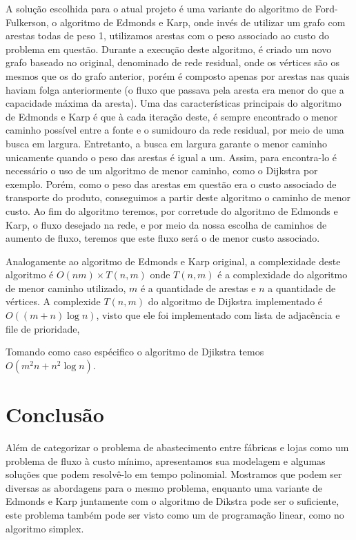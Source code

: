 \documentclass[12pt, a4]{article}
\begin{document}
A solução escolhida para o atual projeto é uma variante do algoritmo de
Ford-Fulkerson, o algoritmo de Edmonds e Karp, onde invés de utilizar um grafo
com arestas todas de peso 1, utilizamos arestas com o peso associado ao custo do
problema em questão. Durante a execução deste algoritmo, é criado um novo grafo
baseado no original, denominado de rede residual, onde os vértices são os mesmos
que os do grafo anterior, porém é composto apenas por arestas nas quais haviam
folga anteriormente (o fluxo que passava pela aresta era menor do que a
capacidade máxima da aresta). Uma das características principais do algoritmo de
Edmonds e Karp é que à cada iteração deste, é sempre encontrado o menor caminho
possível entre a fonte e o sumidouro da rede residual, por meio de uma busca em
largura. Entretanto, a busca em largura garante o menor caminho unicamente
quando o peso das arestas é igual a um. Assim, para encontra-lo é necessário o
uso de um algoritmo de menor caminho, como o Dijkstra por exemplo. Porém, como o
peso das arestas em questão era o custo associado de transporte do produto,
conseguimos a partir deste algoritmo o caminho de menor custo. Ao fim do
algoritmo teremos, por corretude do algoritmo de Edmonds e Karp, o fluxo
desejado na rede, e por meio da nossa escolha de caminhos de aumento de fluxo,
teremos que este fluxo será o de menor custo associado.

Analogamente ao algoritmo de Edmonds e Karp original, a complexidade deste
algoritmo é $O(nm) \times T(n,m)$ onde $T(n,m)$ é a complexidade do algoritmo de
menor caminho utilizado, $m$ é a quantidade de arestas e $n$ a quantidade de
vértices. A complexide $T(n,m)$ do algoritmo de Dijkstra implementado é
$O((m + n) \log n)$, visto que ele foi implementado com lista de adjacência e file de
prioridade,

Tomando como caso espécifico o algoritmo de Djikstra
temos $O(m^2 n + n^2 \log n)$.

\section{Conclusão}
\label{sec:conclusion}

Além de categorizar o problema de abastecimento entre fábricas e lojas como um
problema de fluxo à custo mínimo, apresentamos sua modelagem e algumas soluções
que podem resolvê-lo em tempo polinomial. Mostramos que podem ser diversas as
abordagens para o mesmo problema, enquanto uma variante de Edmonds e Karp
juntamente com o algoritmo de Dikstra pode ser o suficiente, este problema
também pode ser visto como um de programação linear, como no algoritmo simplex.
\end{document}
